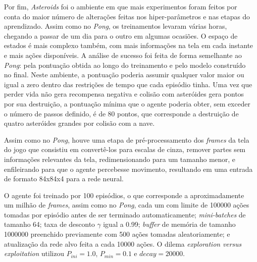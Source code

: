 Por fim, \textit{Asteroids} foi o ambiente em que mais experimentos foram feitos por conta do maior número de alterações feitas nos hiper-parâmetros e nas etapas do aprendizado.
Assim como no \textit{Pong}, os treinamentos levaram várias horas, chegando a passar de um dia para o outro em algumas ocasiões.
O espaço de estados é mais complexo também, com mais informações na tela em cada instante e mais ações disponíveis.
A análise de sucesso foi feita de forma semelhante ao \textit{Pong}: pela pontuação obtida ao longo do treinamento e pelo modelo construído no final.
Neste ambiente, a pontuação poderia assumir qualquer valor maior ou igual a zero dentro das restrições de tempo que cada episódio tinha.
Uma vez que perder vida não gera recompensa negativa e colisão com asteróides gera pontos por sua destruição, a pontuação mínima que o agente poderia obter, sem exceder o número de passos definido, é de 80 pontos, que corresponde a destruição de quatro asteróides grandes por colisão com a nave.

Assim como no \textit{Pong}, houve uma etapa de pré-processamento dos \textit{frames} da tela do jogo que consistiu em convertê-los para escalas de cinza, remover partes sem informações relevantes da tela, redimensionando para um tamanho menor, e enfileirando para que o agente percebesse movimento, resultando em uma entrada de formato 84x84x4 para a rede neural.

O agente foi treinado por 100 episódios, o que corresponde a aproximadamente um milhão de \textit{frames}, assim como no \textit{Pong}, cada um com limite de 100000 ações tomadas por episódio antes de ser terminado automaticamente;
\textit{mini-batches} de tamanho 64;
taxa de desconto $\gamma$ igual a 0.99;
\textit{buffer} de memória de tamanho 1000000 preenchido previamente com 500 ações tomadas aleatoriamente;
e atualização da rede alvo feita a cada 10000 ações.
O dilema \textit{exploration versus exploitation} utilizou $P_{ini} = 1.0$, $P_{min} = 0.1$ e $decay = 20000$.


